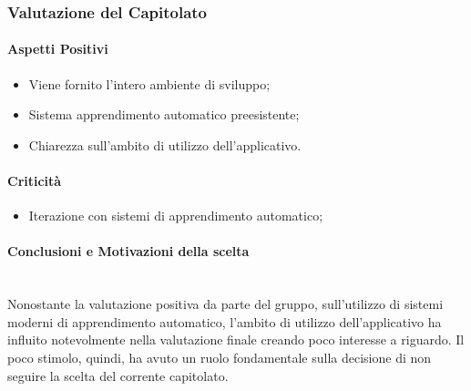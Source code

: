 \subsubsection{Valutazione del Capitolato}

\paragraph{Aspetti Positivi}
\begin{itemize}
	\item Viene fornito l'intero ambiente di sviluppo;
	\item Sistema apprendimento automatico preesistente;
	\item Chiarezza sull'ambito di utilizzo dell'applicativo.
\end{itemize}

\paragraph{Criticità}
\begin{itemize}
	\item Iterazione con sistemi di apprendimento automatico;
\end{itemize}

\paragraph{Conclusioni e Motivazioni della scelta} ~\\
Nonostante la valutazione positiva da parte del gruppo, sull'utilizzo di sistemi moderni di apprendimento automatico, l'ambito di utilizzo dell'applicativo ha influito notevolmente nella valutazione finale creando poco interesse a riguardo.
Il poco stimolo, quindi, ha avuto un ruolo fondamentale sulla decisione di non seguire la scelta del corrente capitolato.